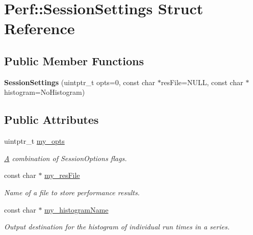 \hypertarget{structPerf_1_1SessionSettings}{}\section{Perf\+:\+:Session\+Settings Struct Reference}
\label{structPerf_1_1SessionSettings}
\subsection*{Public Member Functions}
\begin{DoxyCompactItemize}
\item 
\hypertarget{structPerf_1_1SessionSettings_a29b63699032848903e72d8834bca6eaf}{}{\bfseries Session\+Settings} (uintptr\+\_\+t opts=0, const char $\ast$res\+File=N\+U\+L\+L, const char $\ast$histogram=No\+Histogram)\label{structPerf_1_1SessionSettings_a29b63699032848903e72d8834bca6eaf}

\end{DoxyCompactItemize}
\subsection*{Public Attributes}
\begin{DoxyCompactItemize}
\item 
\hypertarget{structPerf_1_1SessionSettings_ad6fc0229d27cc7294dc74d1061f0ff3d}{}uintptr\+\_\+t \hyperlink{structPerf_1_1SessionSettings_ad6fc0229d27cc7294dc74d1061f0ff3d}{my\+\_\+opts}\label{structPerf_1_1SessionSettings_ad6fc0229d27cc7294dc74d1061f0ff3d}

\begin{DoxyCompactList}\small\item\em \hyperlink{structA}{A} combination of Session\+Options flags. \end{DoxyCompactList}\item 
const char $\ast$ \hyperlink{structPerf_1_1SessionSettings_a428bb34d80e45daadf7f0d755d273572}{my\+\_\+res\+File}
\begin{DoxyCompactList}\small\item\em Name of a file to store performance results. \end{DoxyCompactList}\item 
const char $\ast$ \hyperlink{structPerf_1_1SessionSettings_a48903a128e21238cf885e2766e2cb8bc}{my\+\_\+histogram\+Name}
\begin{DoxyCompactList}\small\item\em Output destination for the histogram of individual run times in a series. \end{DoxyCompactList}\end{DoxyCompactItemize}


